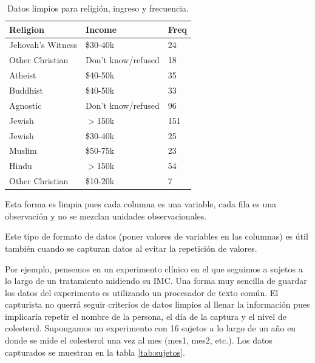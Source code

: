 \documentclass[]{article}
\begin{document}
\begin{table}[ht]
\centering
\begin{tabular}{lll}
  \hline
Religion & Income & Freq \\ 
  \hline
Jehovah's Witness & \$30-40k & 24 \\ 
  Other Christian & Don't know/refused & 18 \\ 
  Atheist & \$40-50k & 35 \\ 
  Buddhist & \$40-50k & 33 \\ 
  Agnostic & Don't know/refused & 96 \\ 
  Jewish & $>$150k & 151 \\ 
  Jewish & \$30-40k & 25 \\ 
  Muslim & \$50-75k & 23 \\ 
  Hindu & $>$150k & 54 \\ 
  Other Christian & \$10-20k & 7 \\ 
   \hline
\end{tabular}
\caption{Datos limpios para religión, ingreso y frecuencia.} 
\label{tab:ej1limpio}
\end{table}

\begin{nota}[Nota] 
Esta forma es limpia pues cada columna es una variable, cada fila es una observación
y no se mezclan unidades observacionales.
\end{nota}

Este tipo de formato de datos (poner valores de variables en las
columnas) es útil también cuando se capturan datos al evitar la
repetición de valores.

Por ejemplo, pensemos en un experimento clínico en el que seguimos a
sujetos a lo largo de un tratamiento midiendo su IMC. Una forma muy
sencilla de guardar los datos del experimento es utilizando un
procesador de texto común. El capturista no querrá seguir criterios de
datos limpios al llenar la información pues implicaría repetir el nombre
de la persona, el día de la captura y el nivel de colesterol. Supongamos
un experimento con 16 sujetos a lo largo de un año en donde se mide el
colesterol una vez al mes (mes1, mes2, etc.). Los datos capturados se
muestran en la tabla \ref{tab:sujetos}.
\end{document}
